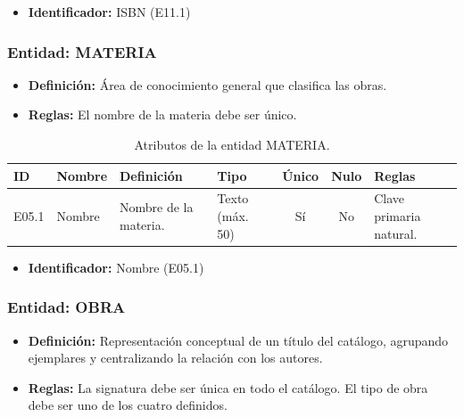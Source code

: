 	\begin{itemize}
		\item\textbf{Identificador:} ISBN (E11.1)
	\end{itemize}
	
	\subsubsection{Entidad: MATERIA}
	\begin{itemize}
		\item\textbf{Definición:} Área de conocimiento general que clasifica las obras.
		\item\textbf{Reglas:} El nombre de la materia debe ser único.
	\end{itemize}
	
	\begin{table}[H]
		\centering
		\caption{Atributos de la entidad MATERIA.}
		\label{tab:dict_materia}
		\small
		\begin{tabularx}{\textwidth}{l l X l c c X}
			\toprule
			\textbf{ID} & \textbf{Nombre} & \textbf{Definición} & \textbf{Tipo} & \textbf{Único} & \textbf{Nulo} & \textbf{Reglas} \\
			\midrule
			E05.1 & Nombre & Nombre de la materia. & Texto (máx. 50) & Sí & No & Clave primaria natural. \\
			\bottomrule
		\end{tabularx}
	\end{table}
	
	\begin{itemize}
		\item\textbf{Identificador:} Nombre (E05.1)
	\end{itemize}
	
	\subsubsection{Entidad: OBRA}
	\begin{itemize}
		\item\textbf{Definición:} Representación conceptual de un título del catálogo, agrupando ejemplares y centralizando la relación con los autores.
		\item\textbf{Reglas:} La signatura debe ser única en todo el catálogo. El tipo de obra debe ser uno de los cuatro definidos.
	\end{itemize}
	
